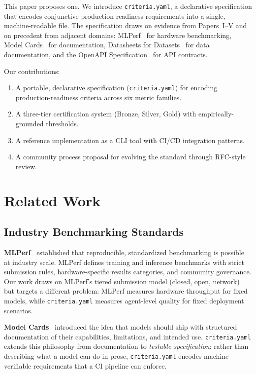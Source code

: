 \documentclass[11pt]{article}
\newcommand{\criteriayaml}{\texttt{criteria.yaml}}
\begin{document}
This paper proposes one. We introduce \criteriayaml{}, a declarative specification that encodes conjunctive production-readiness requirements into a single, machine-readable file. The specification draws on evidence from Papers~I--V and on precedent from adjacent domains: MLPerf~\citep{reddi2020mlperf} for hardware benchmarking, Model Cards~\citep{mitchell2019modelcards} for documentation, Datasheets for Datasets~\citep{gebru2021datasheets} for data documentation, and the OpenAPI Specification~\citep{openapi2021} for API contracts.

Our contributions:
\begin{enumerate}[leftmargin=16pt]
  \item A portable, declarative specification (\criteriayaml{}) for encoding production-readiness criteria across six metric families.
  \item A three-tier certification system (Bronze, Silver, Gold) with empirically-grounded thresholds.
  \item A reference implementation as a CLI tool with CI/CD integration patterns.
  \item A community process proposal for evolving the standard through RFC-style review.
\end{enumerate}


\section{Related Work}
\label{sec:related}

\subsection{Industry Benchmarking Standards}

\textbf{MLPerf}~\citep{reddi2020mlperf,mattson2020mlperf} established that reproducible, standardized benchmarking is possible at industry scale. MLPerf defines training and inference benchmarks with strict submission rules, hardware-specific results categories, and community governance. Our work draws on MLPerf's tiered submission model (closed, open, network) but targets a different problem: MLPerf measures hardware throughput for fixed models, while \criteriayaml{} measures agent-level quality for fixed deployment scenarios.

\textbf{Model Cards}~\citep{mitchell2019modelcards} introduced the idea that models should ship with structured documentation of their capabilities, limitations, and intended use. \criteriayaml{} extends this philosophy from documentation to \emph{testable specification}: rather than describing what a model can do in prose, \criteriayaml{} encodes machine-verifiable requirements that a CI pipeline can enforce.
\end{document}
